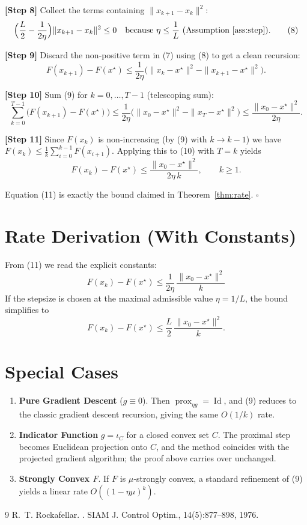 \documentclass{article}
\newcommand{\prox}{\operatorname{prox}}
\begin{document}
\noindent\textbf{[Step 8]} \;Collect the terms containing $\|x_{k+1}-x_{k}\|^{2}$:
\[
\Big(\frac{L}{2}-\frac{1}{2\eta}\Big)\|x_{k+1}-x_{k}\|^{2}
\le 0
\quad\text{because }\eta\le\frac{1}{L}\text{ (Assumption \ref{ass:step})}.
\tag{8}
\]

\noindent\textbf{[Step 9]} \;Discard the non‑positive term in (7) using (8) to get a clean recursion:
\[
F(x_{k+1})-F(x^{\star})
\le \frac{1}{2\eta}\Big(\|x_{k}-x^{\star}\|^{2}
-\|x_{k+1}-x^{\star}\|^{2}\Big).
\tag{9}
\]

\noindent\textbf{[Step 10]} \;Sum (9) for $k=0,\dots,T-1$ (telescoping sum):
\[
\sum_{k=0}^{T-1}\bigl(F(x_{k+1})-F(x^{\star})\bigr)
\le\frac{1}{2\eta}\bigl(\|x_{0}-x^{\star}\|^{2}-\|x_{T}-x^{\star}\|^{2}\bigr)
\le\frac{\|x_{0}-x^{\star}\|^{2}}{2\eta}.
\tag{10}
\]

\noindent\textbf{[Step 11]} \;Since $F(x_{k})$ is non‑increasing (by (9) with $k\to k-1$) we have $F(x_{k})\le\frac{1}{k}\sum_{i=0}^{k-1}F(x_{i+1})$. Applying this to (10) with $T=k$ yields
\[
F(x_{k})-F(x^{\star})\le\frac{\|x_{0}-x^{\star}\|^{2}}{2\eta\,k},
\qquad k\ge1.
\tag{11}
\]

Equation (11) is exactly the bound claimed in Theorem~\ref{thm:rate}. $\square$

\section*{Rate Derivation (With Constants)}
From (11) we read the explicit constants:
\[
\boxed{
\displaystyle
F(x_{k})-F(x^{\star})\le \frac{1}{2\eta}\,\frac{\|x_{0}-x^{\star}\|^{2}}{k}
}
\]
If the stepsize is chosen at the maximal admissible value $\eta=1/L$, the bound simplifies to
\[
F(x_{k})-F(x^{\star})\le \frac{L}{2}\,\frac{\|x_{0}-x^{\star}\|^{2}}{k}.
\]

\section*{Special Cases}
\begin{enumerate}[label=\arabic*.]
  \item \textbf{Pure Gradient Descent} ($g\equiv0$). Then $\prox_{\eta g}=\operatorname{Id}$, and (9) reduces to the classic gradient descent recursion, giving the same $O(1/k)$ rate.
  \item \textbf{Indicator Function} $g=\iota_{C}$ for a closed convex set $C$. The proximal step becomes Euclidean projection onto $C$, and the method coincides with the projected gradient algorithm; the proof above carries over unchanged.
  \item \textbf{Strongly Convex $F$}. If $F$ is $\mu$‑strongly convex, a standard refinement of (9) yields a linear rate $O((1-\eta\mu)^{k})$.
\end{enumerate}

\begin{thebibliography}{9}
R.~T. Rockafellar.
.
\newblock SIAM J. Control Optim., 14(5):877–898, 1976.
\end{thebibliography}
\end{document}
